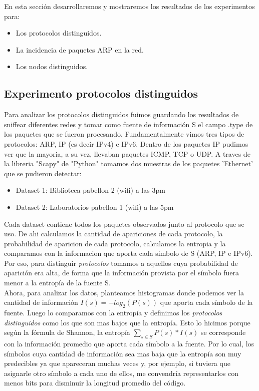 En esta sección desarrollaremos y mostraremos los resultados de los experimentos para:

\begin{itemize}
\item Los protocolos distinguidos.
\item La incidencia de paquetes ARP en la red.
\item Los nodos distinguidos.
\end{itemize}

\subsection{Experimento protocolos distinguidos}

Para analizar los protocolos distinguidos fuimos guardando los resultados de sniffear diferentes redes y tomar como fuente de información S el campo .type de los paquetes que se fueron procesando. Fundamentalmente vimos tres tipos de protocolos: ARP, IP (es decir IPv4) e IPv6. Dentro de los paquetes IP pudimos ver que la mayoria, a su vez, llevaban paquetes ICMP, TCP o UDP. A traves de la libreria "Scapy" de "Python" tomamos dos muestras de los paquetes 'Ethernet' que se pudieron detectar:

\begin{itemize}
\item Dataset 1: Biblioteca pabellon 2 (wifi) a las 3pm
\item Dataset 2: Laboratorios pabellon 1 (wifi) a las 5pm
\end{itemize}

Cada dataset contiene todos los paquetes observados junto al protocolo que se uso. De ahi calculamos la cantidad de apariciones de cada protocolo, la probabilidad de aparicion de cada protocolo, calculamos la entropia y la comparamos con la informacion que aporta cada simbolo de S (ARP, IP e IPv6).\\

Por eso, para distinguir \emph{protocolos} tomamos a
aquellos cuya probabilidad de aparición era alta, de forma que la información provista por el símbolo fuera menor a la entropía de la fuente S.\\

Ahora, para analizar los datos, planteamos histogramas donde podemos ver la cantidad de información $I(s) = -log_2(P(s))$ que aporta cada símbolo de la fuente. Luego lo comparamos con la entropía y definimos los \emph{protocolos distinguidos} como los que son mas bajos que la entropía. Esto lo hicimos porque según la fórmula de Shannon, la entropía $\sum\limits_{s \in S} P(s) * I(s)$ se corresponde con la información promedio que aporta cada símbolo a la fuente. Por lo cual, los símbolos cuya cantidad de información sea mas baja que la entropía son muy predecibles ya que apareceran muchas veces y, por ejemplo, si tuviera que asignarle otro símbolo a cada uno de ellos, me convendría representarlos con menos bits para disminuir la longitud promedio del código. \\

